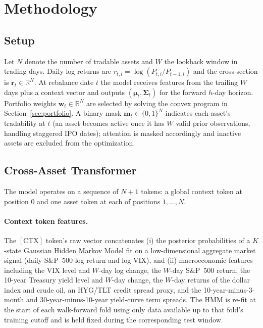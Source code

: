 \documentclass[11pt]{article}
\newcommand{\R}{\mathbb{R}}
\newcommand{\CTX}{[\mathrm{CTX}]}
\newcommand{\Sig}{\boldsymbol{\Sigma}}
\newcommand{\bmu}{\boldsymbol{\mu}}
\newcommand{\br}{\mathbf{r}}
\newcommand{\bw}{\mathbf{w}}
\begin{document}
\section{Methodology}\label{sec:method}

\subsection{Setup}\label{sec:setup}

Let $N$ denote the number of tradable assets and $W$ the lookback
window in trading days. Daily log returns are $r_{t,i} =
\log(P_{t,i}/P_{t-1,i})$ and the cross-section is $\br_t \in \R^N$. At
rebalance date $t$ the model receives features from the trailing $W$
days plus a context vector and outputs $(\bmu_t, \Sig_t)$ for the
forward $h$-day horizon. Portfolio weights $\bw_t \in \R^N$ are
selected by solving the convex program in
Section~\ref{sec:portfolio}. A binary mask $\mathbf{m}_t \in \{0,1\}^N$
indicates each asset's tradability at $t$ (an asset becomes active once
it has $W$ valid prior observations, handling staggered IPO dates);
attention is masked accordingly and inactive assets are excluded from
the optimization.

\subsection{Cross-Asset Transformer}\label{sec:architecture}

The model operates on a sequence of $N{+}1$ tokens: a global context
token at position $0$ and one asset token at each of positions
$1,\ldots,N$.

\paragraph{Context token features.} The $\CTX$ token's raw vector
concatenates (i) the posterior probabilities of a $K$-state Gaussian
Hidden Markov Model fit on a low-dimensional aggregate market signal
(daily S\&P~500 log return and log VIX), and (ii) macroeconomic features
including the VIX level and $W$-day log change, the $W$-day S\&P~500
return, the 10-year Treasury yield level and $W$-day change, the
$W$-day returns of the dollar index and crude oil, an HYG/TLT credit
spread proxy, and the 10-year-minus-3-month and 30-year-minus-10-year
yield-curve term spreads. The HMM is re-fit at the start of each
walk-forward fold using only data available up to that fold's training
cutoff and is held fixed during the corresponding test window.
\end{document}
